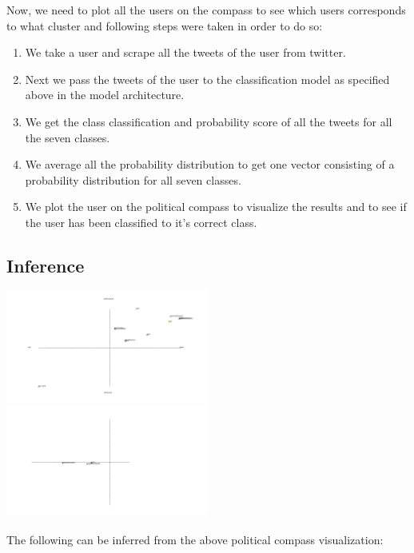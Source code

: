 \documentclass[10pt, oneside]{article}
\begin{document}
\begin{multicols}{2}
Now, we need to plot all the users on the compass to see which users corresponds to what cluster and following steps were taken in order to do so:
\begin{enumerate}
	\item We take a user and scrape all the tweets of the user from twitter.
	\item Next we pass the tweets of the user to the classification model as specified above in the model architecture.
	\item We get the class classification and probability score  of all the tweets for all the seven classes.
	\item We average all the probability distribution to get one vector consisting of a probability distribution for all seven classes.
	\item We plot the user on the political compass to visualize the results and to see if the user has been classified to it’s correct class.
\end{enumerate}

\subsection{Inference}

\includegraphics[width=0.5\textwidth]{images/Political_Compass.png}
\includegraphics[width=0.5\textwidth]{images/Political_Compass-1.png}

The following can be inferred from the above political compass visualization:


\end{multicols}
\end{document}
